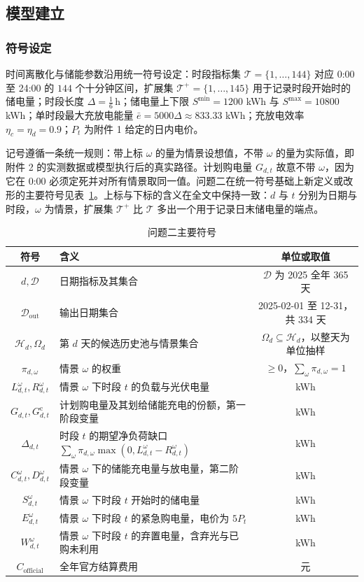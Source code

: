 \subsection{模型建立}

\subsubsection{符号设定}

时间离散化与储能参数沿用统一符号设定：时段指标集 $\mathcal{T}=\{1,\ldots,144\}$ 对应 0:00 至 24:00 的 $144$ 个十分钟区间，扩展集 $\mathcal{T}^+=\{1,\ldots,145\}$ 用于记录时段开始时的储电量；时段长度 $\Delta=\frac16\,\mathrm h$；储电量上下限 $S^{\min}=1200$ kWh 与 $S^{\max}=10800$ kWh；单时段最大充放电能量 $\bar e=5000\Delta\approx833.33$ kWh；充放电效率 $\eta_c=\eta_d=0.9$；$P_t$ 为附件 1 给定的日内电价。

记号遵循一条统一规则：带上标 $\omega$ 的量为情景设想值，不带 $\omega$ 的量为实际值，即附件 2 的实测数据或模型执行后的真实路径。计划购电量 $G_{d,t}$ 故意不带 $\omega$，因为它在 0:00 必须定死并对所有情景取同一值。问题二在统一符号基础上新定义或改形的主要符号见表~\ref{tab:sym2}。上标与下标的含义在全文中保持一致：$d$ 与 $t$ 分别为日期与时段，$\omega$ 为情景，扩展集 $\mathcal{T}^+$ 比 $\mathcal{T}$ 多出一个用于记录日末储电量的端点。

\begin{table}[htbp]
\centering
\caption{问题二主要符号}
\label{tab:sym2}
\begin{tabular}{clc}
\toprule
符号 & 含义 & 单位或取值 \\
\midrule
$d,\mathcal{D}$ & 日期指标及其集合 & $\mathcal{D}$ 为 2025 全年 365 天 \\
$\mathcal{D}_{\mathrm{out}}$ & 输出日期集合 & 2025-02-01 至 12-31，共 334 天 \\
$\mathcal{H}_d,\Omega_d$ & 第 $d$ 天的候选历史池与情景集合 & $\Omega_d\subseteq\mathcal{H}_d$，以整天为单位抽样 \\
$\pi_{d,\omega}$ & 情景 $\omega$ 的权重 & $\ge0$，$\sum_{\omega}\pi_{d,\omega}=1$ \\
$L_{d,t}^{\omega},R_{d,t}^{\omega}$ & 情景 $\omega$ 下时段 $t$ 的负载与光伏电量 & kWh \\
$G_{d,t},G^{\mathrm{c}}_{d,t}$ & 计划购电量及其划给储能充电的份额，第一阶段变量 & kWh \\
$\Delta_{d,t}$ & 时段 $t$ 的期望净负荷缺口 $\sum_\omega\pi_{d,\omega}\max(0,L^{\omega}_{d,t}-R^{\omega}_{d,t})$ & kWh \\
$C_{d,t}^{\omega},D_{d,t}^{\omega}$ & 情景 $\omega$ 下的储能充电量与放电量，第二阶段变量 & kWh \\
$S_{d,t}^{\omega}$ & 情景 $\omega$ 下时段 $t$ 开始时的储电量 & kWh \\
$E_{d,t}^{\omega}$ & 情景 $\omega$ 下时段 $t$ 的紧急购电量，电价为 $5P_t$ & kWh \\
$W_{d,t}^{\omega}$ & 情景 $\omega$ 下时段 $t$ 的弃置电量，含弃光与已购未利用 & kWh \\
$C_{\mathrm{official}}$ & 全年官方结算费用 & 元 \\
\bottomrule
\end{tabular}
\end{table}

